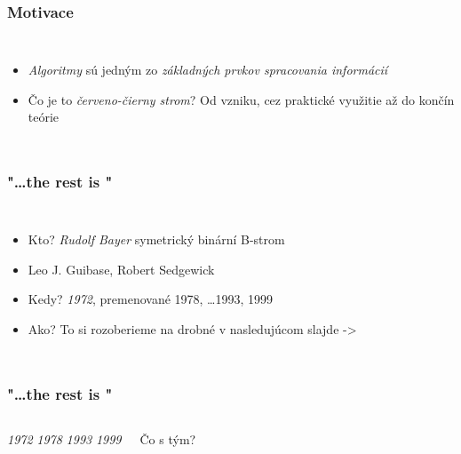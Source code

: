 \documentclass[english]{template/fitthesispresn.cls}
\begin{document}
    \frame[plain]{\titlepage}

    \begin{frame}
        \frametitle{Motivace}
        \begin{columns}
            \begin{itemize}
                \item \emph{Algoritmy} sú jedným zo \emph{základných prvkov spracovania informácií}
                \\
                \item Čo je to \emph{červeno-čierny strom}?
                \subitem Od vzniku, cez praktické využitie až do končín teórie
            \end{itemize}
        \end{columns}
    \end{frame}


    \begin{frame}
        \frametitle{"\ldots the rest is "}
        \begin{columns}
            \begin{itemize}
                \item Kto? \emph{Rudolf Bayer}
                    \subitem symetrický binární B-strom
                \item Leo J. Guibase, Robert Sedgewick
                \item Kedy? \emph{1972}, premenované 1978, \ldots 1993, 1999
                \item Ako? To si rozoberieme na drobné v nasledujúcom slajde ->
            \end{itemize}
        \end{columns}
    \end{frame}
    \begin{frame}
        \frametitle{"\ldots the rest is "}
        \begin{columns}

                \emph{1972}
                \emph{1978}
                \emph{1993}
                \emph{1999}
                \item Čo s tým?

        \end{columns}
    \end{frame}
\end{document}
